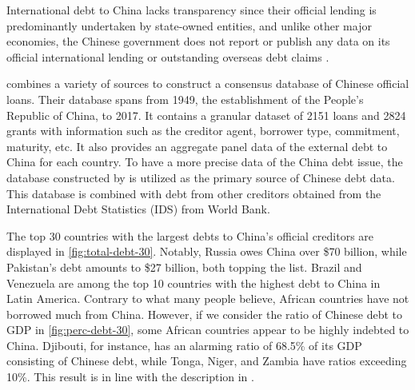 International debt to China lacks transparency since their official lending is predominantly undertaken by state-owned entities, and unlike other major economies, the Chinese government does not report or publish any data on its official international lending or outstanding overseas debt claims \citep*{Horn-Reinhart-Trebesch-21}.


\citet*{Horn-Reinhart-Trebesch-21} combines a variety of sources to construct a consensus database of Chinese official loans.
Their database spans from 1949, the establishment of the People's Republic of China, to 2017. It contains a granular dataset of 2151 loans and 2824 grants with information such as the creditor agent, borrower type, commitment, maturity, etc. It also provides an aggregate panel data of the external debt to China for each country.
To have a more precise data of the China debt issue, the database constructed by \citet*{Horn-Reinhart-Trebesch-21} is utilized as the primary source of Chinese debt data. This database is combined with debt from other creditors obtained from the International Debt Statistics (IDS) from World Bank.

The top 30 countries with the largest debts to China's official creditors are displayed in \autoref{fig:total-debt-30}. Notably, Russia owes China over \$70 billion, while Pakistan's debt amounts to \$27 billion, both topping the list. Brazil and Venezuela are among the top 10 countries with the highest debt to China in Latin America. Contrary to what many people believe, African countries have not borrowed much from China. However, if we consider the ratio of Chinese debt to GDP in \autoref{fig:perc-debt-30}, some African countries appear to be highly indebted to China. Djibouti, for instance, has an alarming ratio of 68.5\% of its GDP consisting of Chinese debt, while Tonga, Niger, and Zambia have ratios exceeding 10\%. This result is in line with the description in \citet{Eom-18}.

